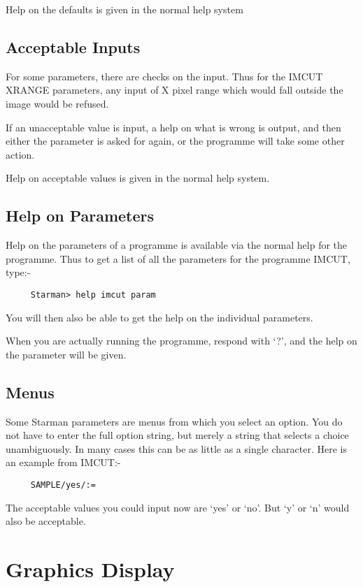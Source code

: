 Help on the defaults is given in the normal help system

\subsection{Acceptable Inputs}
\label{se:param_acc}

For some parameters, there are checks on the input. Thus for the
IMCUT XRANGE parameters, any input of X pixel range which would fall
outside the image would be refused.

If an unacceptable value is input, a help on what is wrong is output,
and then either the parameter is asked for again, or the programme will
take some other action.

Help on acceptable values is given in the normal help system.

\subsection{Help on Parameters}
\label{se:param_hel}

Help on the parameters of a programme is available via the normal help
for the programme. Thus to get a list of all the parameters for the 
programme IMCUT, type:-
\begin{verbatim}
     Starman> help imcut param
\end{verbatim}

You will then also be able to get the help on the individual 
parameters.

When you are actually running the programme, respond with `?', and the
help on the parameter will be given.


\subsection{Menus}

Some Starman parameters are menus from which you select an option.
You do not have to enter the full option string, but merely a string 
that selects a choice unambiguously.  In many cases this can be as
little as a single character.  Here is an example from IMCUT:-

\begin{verbatim}
     SAMPLE/yes/:=
\end{verbatim}

The acceptable values you could input now are `yes' or `no'. But `y' or `n'
would also be acceptable. 


\section{Graphics Display}

